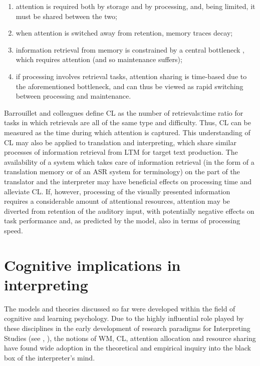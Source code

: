 \begin{enumerate}
\item attention is required both by storage and by processing, and, being limited, it must be shared between the two;
\item when attention is switched away from retention, memory traces decay;
\item information retrieval from memory is constrained by a central bottleneck \citep{pashler_psychology_1998,rohrer_when_1998}, which requires attention (and so maintenance suffers);
\item if processing involves retrieval tasks, attention sharing is time-based due to the aforementioned bottleneck, and can thus be viewed as rapid switching between processing and maintenance.
\end{enumerate}
Barrouillet and colleagues define CL as the number of retrievals:time ratio for tasks in which retrievals are all of the same type and difficulty. Thus, CL can be measured as the time during which attention is captured. This understanding of CL may also be applied to translation and interpreting, which share similar processes of information retrieval from LTM for target text production. The availability of a system which takes care of information retrieval (in the form of a translation memory or of an ASR system for terminology) on the part of the translator and the interpreter may have beneficial effects on processing time and alleviate CL. If, however, processing of the visually presented information requires a considerable amount of attentional resources, attention may be diverted from retention of the auditory input, with potentially negative effects on task performance and, as predicted by the model, also in terms of processing speed.

\section{Cognitive implications in interpreting} \label{interpreting_cognitive}\largerpage
The models and theories discussed so far were developed within the field of cognitive and learning psychology. Due to the highly influential role played by these disciplines in the early development of research paradigms for Interpreting Studies (see \citealt[61]{pochhacker_introducing_2004}, \citealt{ferreira_position_2015}), the notions of WM, CL, attention allocation and resource sharing have found wide adoption in the theoretical and empirical inquiry into the black box of the interpreter's mind.


